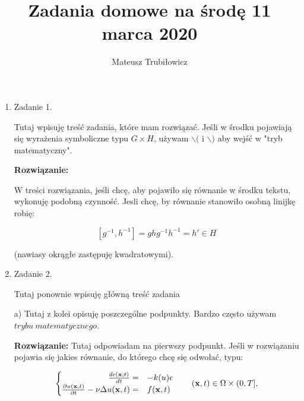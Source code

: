 \documentclass[11pt]{article}
\title{Zadania domowe na środę 11 marca 2020}
\author{Mateusz Trubiłowicz}
\begin{document}
\maketitle
\medskip

\begin{enumerate}


\item
\begin{Large}
Zadanie 1.
\end{Large}
\par
Tutaj wpisuję treść zadania, które mam rozwiązać. Jeśli w środku pojawiają się wyrażenia symboliczne typu \( G \times H\), używam  \(\backslash( \) i \(\backslash) \) %
aby wejść w "tryb matematyczny".\par

\medskip
\textbf{Rozwiązanie: }

W treści rozwiązania, jeśli chcę, aby pojawiło się równanie w środku tekstu, wykonuję podobną czynność. Jesli chcę, by równanie stanowiło osobną linijkę robię:

\[ [g^{-1},h^{-1}]=ghg^{-1}h^{-1}=h'\in H \] 

(nawiasy okrągłe zastępuję kwadratowymi).


\item
\begin{Large}
Zadanie 2.
\end{Large}
\par

Tutaj ponownie wpisuję główną treść zadania\par

a) Tutaj z kolei opisuję poszczególne podpunkty. Bardzo często używam \(trybu \ matematycznego\).\par
\medskip
\textbf{Rozwiązanie: } 
Tutaj odpowiadam na pierwszy podpunkt. Jeśli w rozwiązaniu pojawia się jakies równanie, do którego chcę się odwołać, typu:

\begin{equation}
\label{PODPIS}  %
\begin{cases}
\hfill \frac{d \epsilon(\mathbf{x},t)}{d t} =& -k(u) \epsilon \\
\hfill \frac{\partial u(\mathbf{x},t)}{\partial t} - \nu \Delta u(\mathbf{x},t) =& f(\mathbf{x},t) 
\end{cases} \quad\quad  (\mathbf{x},t) \in \Omega \times (0,T],
\end{equation}


\end{enumerate}
\end{document}
